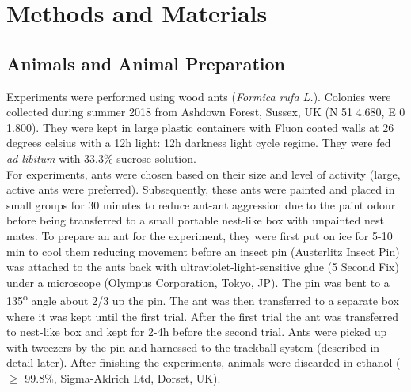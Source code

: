 \chapter{Methods and Materials}
\label{chap:methods}

\hspace{0pt}
\vfill
\section{Animals and Animal Preparation}
Experiments were performed using wood ants (\textit{Formica rufa L.}). Colonies were collected during summer 2018 from Ashdown Forest, Sussex, UK (N 51 4.680, E 0 1.800). They were kept in large plastic containers with Fluon coated walls at 26 degrees celsius with a 12h light: 12h darkness light cycle regime. They were fed \textit{ad libitum} with 33.3\% sucrose solution. \\
For experiments, ants were chosen based on their size and level of activity (large, active ants were preferred). Subsequently, these ants were painted and placed in small groups for 30 minutes to reduce ant-ant aggression due to the paint odour before being transferred to a small portable nest-like box with unpainted nest mates. To prepare an ant for the experiment, they were first put on ice for 5-10 min to cool them reducing movement before an insect pin (Austerlitz Insect Pin) was attached to the ants back with ultraviolet-light-sensitive glue (5 Second Fix) under a microscope (Olympus Corporation, Tokyo, JP). The pin was bent to a 135\textsuperscript{o} angle about 2/3 up the pin. The ant was then transferred to a separate box where it was kept until the first trial. After the first trial the ant was transferred to nest-like box and kept for 2-4h before the second trial. Ants were picked up with tweezers by the pin and harnessed to the trackball system (described in detail later). After finishing the experiments, animals were discarded in ethanol ($\geq$ 99.8\%, Sigma-Aldrich Ltd, Dorset, UK).
\vfill
\hspace{0pt}